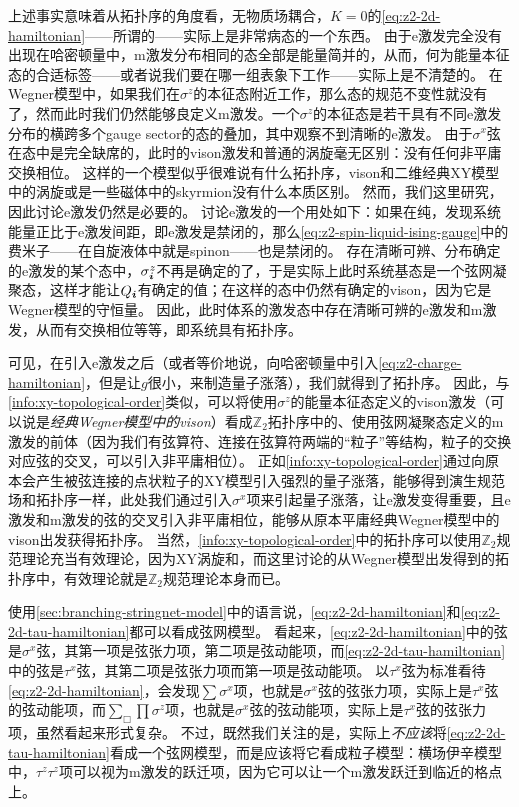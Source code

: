 上述事实意味着从拓扑序的角度看，无物质场耦合，$K=0$的\eqref{eq:z2-2d-hamiltonian}——所谓的——实际上是非常病态的一个东西。
由于e激发完全没有出现在哈密顿量中，m激发分布相同的态全部是能量简并的，从而，何为能量本征态的合适标签——或者说我们要在哪一组表象下工作——实际上是不清楚的。
在Wegner模型中，如果我们在$\sigma^z$的本征态附近工作，那么态的规范不变性就没有了，然而此时我们仍然能够良定义m激发。一个$\sigma^z$的本征态是若干具有不同e激发分布的横跨多个gauge sector的态的叠加，其中观察不到清晰的e激发。
由于$\sigma^x$弦在态中是完全缺席的，此时的vison激发和普通的涡旋毫无区别：没有任何非平庸交换相位。
这样的一个模型似乎很难说有什么拓扑序，vison和二维经典XY模型中的涡旋或是一些磁体中的skyrmion没有什么本质区别。
然而，我们这里研究，因此讨论e激发仍然是必要的。
讨论e激发的一个用处如下：如果在纯，发现系统能量正比于e激发间距，即e激发是禁闭的，那么\eqref{eq:z2-spin-liquid-ising-gauge}中的费米子——在自旋液体中就是spinon——也是禁闭的。
存在清晰可辨、分布确定的e激发的某个态中，$\sigma^z_{\vb*{i}}$不再是确定的了，于是实际上此时系统基态是一个弦网凝聚态，这样才能让$Q_{\vb*{i}}$有确定的值；在这样的态中仍然有确定的vison，因为它是Wegner模型的守恒量。
因此，此时体系的激发态中存在清晰可辨的e激发和m激发，从而有交换相位等等，即系统具有拓扑序。

可见，在引入e激发之后（或者等价地说，向哈密顿量中引入\eqref{eq:z2-charge-hamiltonian}，但是让$g$很小，来制造量子涨落），我们就得到了拓扑序。
因此，与\autoref{info:xy-topological-order}类似，可以将使用$\sigma^z$的能量本征态定义的vison激发（可以说是\emph{经典Wegner模型中的vison}）看成$\mathbb{Z}_2$拓扑序中的、使用弦网凝聚态定义的m激发的前体（因为我们有弦算符、连接在弦算符两端的“粒子”等结构，粒子的交换对应弦的交叉，可以引入非平庸相位）。
正如\autoref{info:xy-topological-order}通过向原本会产生被弦连接的点状粒子的XY模型引入强烈的量子涨落，能够得到演生规范场和拓扑序一样，此处我们通过引入$\sigma^x$项来引起量子涨落，让e激发变得重要，且e激发和m激发的弦的交叉引入非平庸相位，能够从原本平庸经典Wegner模型中的vison出发获得拓扑序。
当然，\autoref{info:xy-topological-order}中的拓扑序可以使用$\mathbb{Z}_2$规范理论充当有效理论，因为XY涡旋和，而这里讨论的从Wegner模型出发得到的拓扑序中，有效理论就是$\mathbb{Z}_2$规范理论本身而已。

使用\autoref{sec:branching-stringnet-model}中的语言说，\eqref{eq:z2-2d-hamiltonian}和\eqref{eq:z2-2d-tau-hamiltonian}都可以看成弦网模型。
看起来，\eqref{eq:z2-2d-hamiltonian}中的弦是$\sigma^x$弦，其第一项是弦张力项，第二项是弦动能项，而\eqref{eq:z2-2d-tau-hamiltonian}中的弦是$\tau^x$弦，其第二项是弦张力项而第一项是弦动能项。
以$\tau^x$弦为标准看待\eqref{eq:z2-2d-hamiltonian}，会发现$\sum \sigma^x$项，也就是$\sigma^x$弦的弦张力项，实际上是$\tau^x$弦的弦动能项，而$\sum_\Box \prod \sigma^z$项，也就是$\sigma^x$弦的弦动能项，实际上是$\tau^x$弦的弦张力项，虽然看起来形式复杂。
不过，既然我们关注的是，实际上\emph{不应该}将\eqref{eq:z2-2d-tau-hamiltonian}看成一个弦网模型，而是应该将它看成粒子模型：横场伊辛模型中，$\tau^z \tau^z$项可以视为m激发的跃迁项，因为它可以让一个m激发跃迁到临近的格点上。


